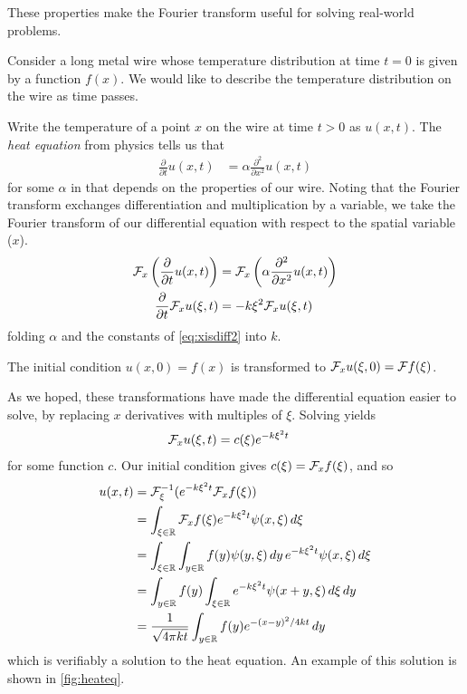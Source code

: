       These properties make the Fourier transform useful for solving real-world problems.
      \begin{example}
        \label{ex:heateq}
        Consider a long metal wire whose temperature distribution at time $t=0$ is given by a function $f(x)$.
        We would like to describe the temperature distribution on the wire as time passes.

        Write the temperature of a point $x$ on the wire at time $t>0$ as $u(x,t)$.
        The \emph{heat equation} from physics tells us that
        \begin{align*}
          \frac{\partial}{\partial t}u(x,t) &= \alpha\frac{\partial^2}{\partial x^2}u(x,t)
        \end{align*}
        for some $\alpha$ in \R that depends on the properties of our wire. 
        Noting that the Fourier transform exchanges differentiation and multiplication by a variable, we take the Fourier transform of our differential equation with respect to the spatial variable ($x$).
        \begin{align*}
          \mathcal{F}_x\left(\frac{\partial}{\partial t}u(x,t)\right) &= \mathcal{F}_x\left(\alpha\frac{\partial^2}{\partial x^2}u(x,t)\right)\\
          \frac{\partial}{\partial t}\mathcal{F}_xu(\xi,t) &= -k\xi^2\mathcal{F}_xu(\xi,t)
        \end{align*}
        folding $\alpha$ and the constants of \eqref{eq:xisdiff2} into $k$.

        The initial condition $u(x,0)=f(x)$ is transformed to $\mathcal{F}_xu(\xi,0) = \mathcal{F} f(\xi)$.
        
        As we hoped, these transformations have made the differential equation easier to solve, by replacing $x$ derivatives with multiples of $\xi$.
        Solving yields
        \begin{align*}
          \mathcal{F}_xu(\xi,t) &= c(\xi)e^{-k\xi^2t}
        \end{align*}
        for some function $c$.
        Our initial condition gives $c(\xi)=\mathcal{F}_x f(\xi)$, and so
        \begin{align*}
          u(x,t) &= \mathcal{F}^{-1}_\xi(e^{-k\xi^2t}\mathcal{F}_x f(\xi))\\
          &= \int_{\xi\in\mathbb{R}} \mathcal{F}_x f(\xi)e^{-k\xi^2t}\psi(x,\xi)\,d\xi\\
          &= \int_{\xi\in\mathbb{R}} \int_{y\in\mathbb{R}} f(y)\psi(y,\xi)\,dy\,e^{-k\xi^2t}\psi(x,\xi)\,d\xi\\
          &= \int_{y\in\mathbb{R}} f(y) \int_{\xi\in\mathbb{R}} e^{-k\xi^2t}\psi(x+y,\xi)\,d\xi\,dy\\
          &= \frac{1}{\sqrt{4\pi kt}}\int_{y\in\mathbb{R}} f(y)e^{-(x-y)^2/4kt}\,dy
        \end{align*}
        which is verifiably a solution to the heat equation.
        An example of this solution is shown in \autoref{fig:heateq}.


\end{example}
